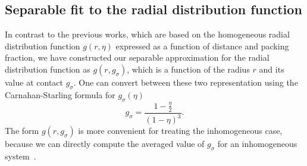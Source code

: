 \documentclass[letterpaper,twocolumn,amsmath,amssymb,pre,aps,10pt]{revtex4-1}
\begin{document}


\subsection{Separable fit to the radial distribution function}

In contrast to the previous works, which are based on the homogeneous
radial distribution function $g(r,\eta)$ expressed as a function of
distance and packing fraction, we have constructed our separable
approximation for the radial distribution function as $g(r,
g_\sigma)$, which is a function of the radius $r$ and its value at
contact $g_\sigma$.  One can convert between these two representation
using the Carnahan-Starling formula for $g_\sigma(\eta)$
\begin{equation}
  g_\sigma = \frac{1-\tfrac{\eta}{2}}{(1-\eta)^3}.
\end{equation}
The form $g(r, g_\sigma)$ is more convenient for treating the
inhomogeneous case, because we can directly compute the averaged value
of $g_\sigma$ for an inhomogeneous system~\cite{schulte2012using}.
\end{document}

